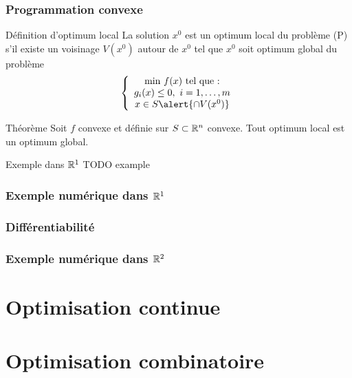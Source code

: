 \documentclass{beamer}
\newcommand{\R}{{\ensuremath\mathbb{R}}}
\begin{document}
\begin{frame}
  \frametitle{Programmation convexe}

  \begin{block}{Définition d'optimum local}
    La solution $x^0$ est un optimum local du problème (P) s'il existe un voisinage
    $V(x^0)$ autour de $x^0$ tel que $x^0$ soit optimum global du problème
  \[
  \left\{
  \begin{array}{c}
    \text{min} \ f(x) \ \text{tel que :} \\
    g_i(x) \leq 0, \ i = 1, \dots, m \\
    x \in S \alert{\cap V(x^0)}
  \end{array}
  \right.
  \]
  \end{block}
  
  \begin{block}{Théorème}
    Soit $f$ convexe et définie sur $S \subset \R^n$ convexe.
    Tout optimum local est un optimum global.  
  \end{block}

  \begin{exampleblock}{Exemple dans $\R^1$}
    TODO example
  \end{exampleblock}
  
\end{frame}

\begin{frame}
  \frametitle{Exemple numérique dans $\R^1$}

\end{frame}

\begin{frame}
  \frametitle{Différentiabilité}

\end{frame}

\begin{frame}
  \frametitle{Exemple numérique dans $\R^2$}

\end{frame}


\section{Optimisation continue}

\section{Optimisation combinatoire}
\end{document}
